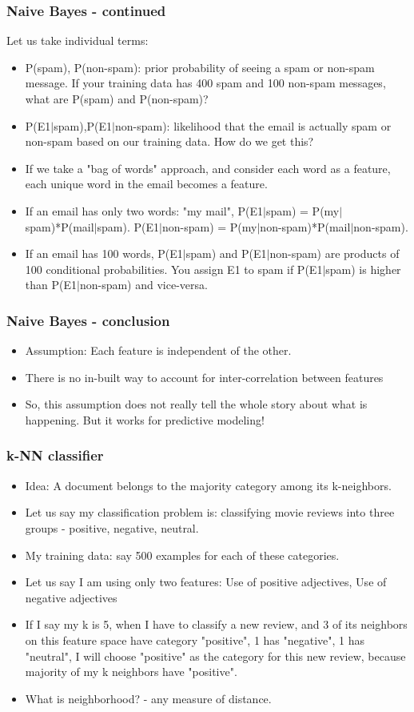 \documentclass{beamer}
\begin{document}
\begin{frame}
\frametitle{Naive Bayes - continued}
Let us take individual terms:
\begin{itemize}
\item P(spam), P(non-spam): prior probability of seeing a spam or non-spam message. If your training data has 400 spam and 100 non-spam messages, what are P(spam) and P(non-spam)? \pause
\item P(E1$|$spam),P(E1$|$non-spam): likelihood that the email is actually spam or non-spam based on our training data. How do we get this?
\item If we take a "bag of words" approach, and consider each word as a feature, each unique word in the email becomes a feature. 
\item If an email has only two words: "my mail", P(E1$|$spam) = P(my$|$spam)*P(mail$|$spam). P(E1$|$non-spam) = P(my$|$non-spam)*P(mail$|$non-spam). \pause
\item If an email has 100 words, P(E1$|$spam) and P(E1$|$non-spam) are products of 100 conditional probabilities. You assign E1 to spam if P(E1$|$spam) is higher than P(E1$|$non-spam) and vice-versa.
\end{itemize}
\end{frame}

\begin{frame}
\frametitle{Naive Bayes - conclusion}
\begin{itemize}
\item Assumption: Each feature is independent of the other.
\item There is no in-built way to account for inter-correlation between features
\item So, this assumption does not really tell the whole story about what is happening. But it works for predictive modeling! 
\end{itemize}
\end{frame}

\begin{frame}
\frametitle{k-NN classifier}
\begin{itemize}
\item Idea: A document belongs to the majority category among its k-neighbors. \pause
\item Let us say my classification problem is: classifying movie reviews into three groups - positive, negative, neutral.
\item My training data: say 500 examples for each of these categories.
\item Let us say I am using only two features: Use of positive adjectives, Use of negative adjectives 
\item If I say my k is 5, when I have to classify a new review, and 3 of its neighbors on this feature space have category "positive", 1 has "negative", 1 has "neutral", I will choose "positive" as the category for this new review, because majority of my k neighbors  have "positive".
\item What is neighborhood? - any measure of distance. 
\end{itemize}
\end{frame}
\end{document}
